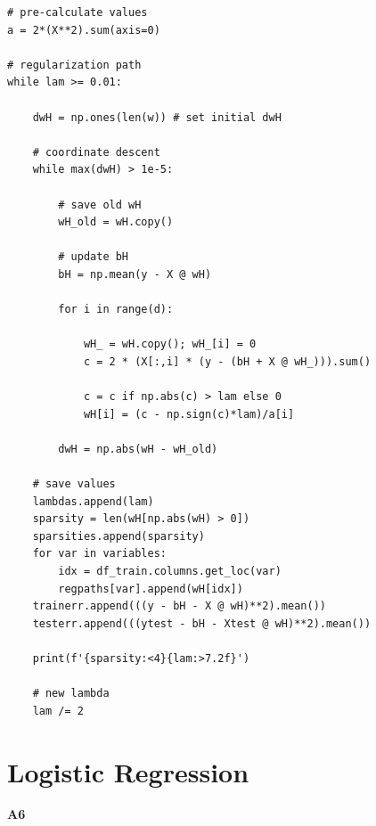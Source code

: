 \documentclass{article}
\begin{document}
\begin{enumerate}
\begin{verbatim}
# pre-calculate values
a = 2*(X**2).sum(axis=0)

# regularization path
while lam >= 0.01:
    
    dwH = np.ones(len(w)) # set initial dwH
    
    # coordinate descent
    while max(dwH) > 1e-5:
        
        # save old wH
        wH_old = wH.copy()

        # update bH
        bH = np.mean(y - X @ wH)
        
        for i in range(d):
            
            wH_ = wH.copy(); wH_[i] = 0
            c = 2 * (X[:,i] * (y - (bH + X @ wH_))).sum()
            
            c = c if np.abs(c) > lam else 0
            wH[i] = (c - np.sign(c)*lam)/a[i]
            
        dwH = np.abs(wH - wH_old)
        
    # save values
    lambdas.append(lam)
    sparsity = len(wH[np.abs(wH) > 0])
    sparsities.append(sparsity)
    for var in variables:
        idx = df_train.columns.get_loc(var)
        regpaths[var].append(wH[idx])
    trainerr.append(((y - bH - X @ wH)**2).mean())
    testerr.append(((ytest - bH - Xtest @ wH)**2).mean())
    
    print(f'{sparsity:<4}{lam:>7.2f}')
    
    # new lambda
    lam /= 2
        \end{verbatim}
\end{enumerate}

\newpage

\section*{Logistic Regression}

\textbf{A6}
\end{document}

